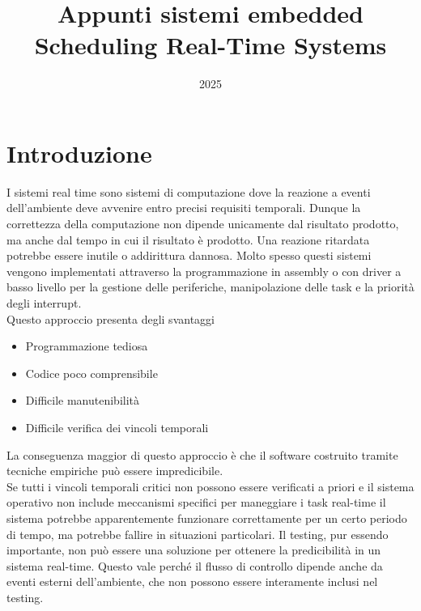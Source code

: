 \documentclass[12pt]{article}
\title{Appunti sistemi embedded \\ Scheduling Real-Time Systems}
\author{}
\date{2025}
\begin{document}
\maketitle
\tableofcontents
\newpage
\section{Introduzione}

I sistemi real time sono sistemi di computazione dove la reazione a eventi dell'ambiente deve avvenire entro precisi requisiti temporali.
Dunque la correttezza della computazione non dipende unicamente dal risultato prodotto, ma anche dal tempo in cui il risultato è prodotto.
Una reazione ritardata potrebbe essere inutile o addirittura dannosa.
Molto spesso questi sistemi vengono implementati attraverso la programmazione in assembly o con driver a basso livello per la gestione delle periferiche, manipolazione delle task 
e la priorità degli interrupt.
\\
Questo approccio presenta degli svantaggi
\begin{itemize}
    \item Programmazione tediosa
    \item Codice poco comprensibile
    \item Difficile manutenibilità
    \item Difficile verifica dei vincoli temporali
\end{itemize}
La conseguenza maggior di questo approccio è che il software costruito tramite tecniche empiriche può  essere impredicibile.\\
Se tutti i vincoli temporali critici non possono essere verificati a priori e il sistema operativo non include meccanismi specifici per maneggiare i task real-time
il sistema potrebbe apparentemente funzionare correttamente per un certo periodo di tempo, ma potrebbe fallire in situazioni particolari.
Il testing, pur essendo importante, non può essere una soluzione per ottenere la predicibilità in un sistema real-time. Questo vale perché 
il flusso di controllo dipende anche da eventi esterni dell'ambiente, che non possono essere interamente inclusi nel testing.
\end{document}
